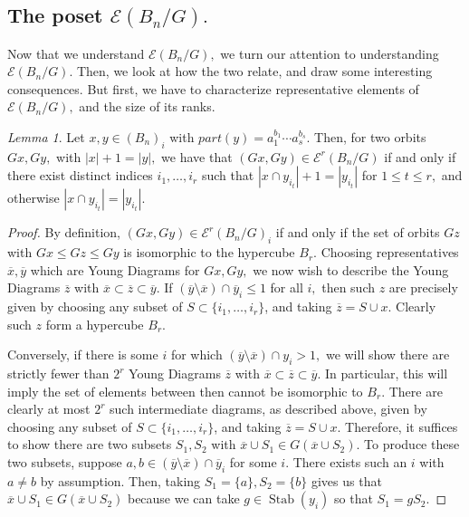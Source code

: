 \documentclass[10 pt]{amsart}
\theoremstyle{plain}
\theoremstyle{definition}
\theoremstyle{remark}
\numberwithin{equation}{section}
\newtheorem{lem}[thm]{Lemma}
\theoremstyle{remark}
\newcommand\ssec{\subsection}
\def\Stab{\operatorname{Stab}}
\begin{document}
\iffalse

\ssec{The poset $\mathcal E(B_n/G).$} Now that we understand $\mathcal E(B_n/G),$ we turn our attention to understanding $\mathcal E(B_n/G).$ Then, we look at how the two relate, and draw some interesting consequences. But first, we have to characterize representative elements of $\mathcal E(B_n/G),$ and the size of its ranks.

\begin{lem}
\label{lem:pairs_in_edge_poset}
Let $x,y \in (B_n)_i$ with $part(y)= a_1^{b_1}\cdots a_s^{b_s}.$ Then, for two orbits $Gx,Gy,$ with $|x|+1=|y|,$ we have that $(Gx, Gy) \in \mathcal E^r(B_n/G)$ if and only if there exist distinct indices $i_1,\ldots, i_r$ such that $|x\cap y_{i_t}|+1 = |y_{i_t}|$ for $1 \leq t \leq r,$ and otherwise  $|x\cap y_{i_t}|= |y_{i_t}|.$
\end{lem}
\begin{proof}
By definition, $(Gx, Gy)\in \mathcal E^r(B_n/G)_i$ if and only if the set of orbits $Gz$ with $Gx \leq Gz \leq Gy$ is isomorphic to the hypercube $B_r.$ Choosing representatives $\overline{x},\overline{y}$ which are Young Diagrams for $Gx,Gy,$ we now wish to describe the Young Diagrams $\overline{z}$ with $\overline{x} \subset \overline{z} \subset \overline{y}.$ If $(\overline{y}\setminus \overline{x}) \cap \overline{y}_i \leq 1$ for all $i,$ then such $z$ are precisely given by choosing any subset of $S \subset \{i_1,\ldots, i_r\}$, and taking $\overline{z} = S \cup x.$ Clearly such $z$ form a hypercube $B_r.$

Conversely, if there is some $i$ for which $(\overline{y}\setminus \overline{x}) \cap y_i > 1,$ we will show there are strictly fewer than $2^r$ Young Diagrams $\overline{z}$ with $\overline{x}\subset \overline{z} \subset \overline{y}.$ In particular, this will imply the set of elements between then cannot be isomorphic to $B_r.$ There are clearly at most $2^r$ such intermediate diagrams, as described above, given by choosing any subset of $S \subset \{i_1,\ldots, i_r\}$, and taking $\overline{z} = S \cup x.$ Therefore, it suffices to show there are two subsets $S_1,S_2$ with $\overline{x}\cup S_1 \in G(\overline{x}\cup S_2).$ To produce these two subsets, suppose $a,b \in (\overline{y}\setminus \overline{x}) \cap \overline{y}_i$ for some $i$. There exists such an $i$ with $a \neq b$ by assumption. Then, taking $S_1 = \{a\},S_2=\{b\}$ gives us that $\overline{x}\cup S_1 \in G(\overline{x}\cup S_2)$ because we can take $g \in \Stab(y_i)$ so that $S_1 = gS_2.$
\end{proof}
\end{document}
